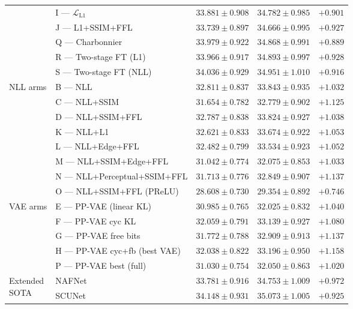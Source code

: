 \documentclass[12pt, a4paper, twoside, openright]{book}
\begin{document}
\begin{landscape}
\begin{longtable}{p{2.4cm}p{7.0cm}ccc}
  & I — $\mathcal{L}_{\mathrm{L1}}$    & $33.881\pm0.908$ & $34.782\pm0.985$ & $+0.901$ \\
  & J — L1+SSIM+FFL                   & $33.739\pm0.897$ & $34.666\pm0.995$ & $+0.927$ \\
  & Q — Charbonnier                    & $33.979\pm0.922$ & $34.868\pm0.991$ & $+0.889$ \\
  & R — Two-stage FT (L1)              & $33.966\pm0.917$ & $34.893\pm0.997$ & $+0.928$ \\
  & S — Two-stage FT (NLL)             & $34.036\pm0.929$ & $34.951\pm1.010$ & $+0.916$ \\
\midrule
\multirow{8}{*}{NLL arms}
  & B — NLL                            & $32.811\pm0.837$ & $33.843\pm0.935$ & $+1.032$ \\
  & C — NLL+SSIM                       & $31.654\pm0.782$ & $32.779\pm0.902$ & $+1.125$ \\
  & D — NLL+SSIM+FFL                   & $32.787\pm0.838$ & $33.824\pm0.927$ & $+1.038$ \\
  & K — NLL+L1                         & $32.621\pm0.833$ & $33.674\pm0.922$ & $+1.053$ \\
  & L — NLL+Edge+FFL                   & $32.482\pm0.799$ & $33.534\pm0.923$ & $+1.052$ \\
  & M — NLL+SSIM+Edge+FFL              & $31.042\pm0.774$ & $32.075\pm0.853$ & $+1.033$ \\
  & N — NLL+Perceptual+SSIM+FFL        & $31.713\pm0.776$ & $32.849\pm0.907$ & $+1.137$ \\
  & O — NLL+SSIM+FFL (PReLU)           & $28.608\pm0.730$ & $29.354\pm0.892$ & $+0.746$ \\
\midrule
\multirow{5}{*}{VAE arms}
  & E — PP-VAE (linear KL)             & $30.985\pm0.765$ & $32.025\pm0.832$ & $+1.040$ \\
  & F — PP-VAE cyc KL                  & $32.059\pm0.791$ & $33.139\pm0.927$ & $+1.080$ \\
  & G — PP-VAE free bits               & $31.772\pm0.788$ & $32.909\pm0.913$ & $+1.137$ \\
  & H — PP-VAE cyc+fb (best VAE)       & $32.038\pm0.822$ & $33.196\pm0.950$ & $+1.158$ \\
  & P — PP-VAE best (full)             & $31.030\pm0.754$ & $32.050\pm0.863$ & $+1.020$ \\
\midrule
\multirow{2}{*}{\parbox{2.2cm}{Extended\\SOTA}}
  & NAFNet \cite{chen_nafnet_2022}     & $33.781\pm0.916$ & $34.753\pm1.009$ & $+0.972$ \\
  & SCUNet \cite{zhang_scunet_2023}    & $\mathbf{34.148\pm0.931}$ & $\mathbf{35.073\pm1.005}$ & $+0.925$ \\
%
\end{longtable}
\end{landscape}
\end{document}
